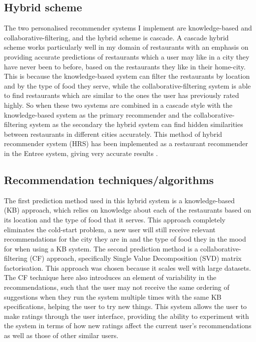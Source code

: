 \documentclass[conference]{IEEEtran}
\begin{document}
\subsection{Hybrid scheme}
The two personalised recommender systems I implement are knowledge-based and collaborative-filtering, and 
the hybrid scheme is cascade. 
A cascade hybrid scheme works particularly well in my domain of restaurants with an emphasis on providing accurate 
predictions of restaurants which a user may like in a city they have never been to before, based on the restaurants 
they like in their home-city. 
This is because the knowledge-based system can filter the restaurants by location and by the type of food they serve, 
while the collaborative-filtering system is able to find restaurants which are similar to the ones the user has 
previously rated highly. 
So when these two systems are combined in a cascade style with the knowledge-based system as the primary recommender 
and the collaborative-filtering system as the secondary the hybrid system can find hidden similarities between 
restaurants in different cities accurately. 
This method of hybrid recommender system (HRS) has been implemented as a restaurant recommender in the Entree 
system, giving very accurate results \cite{burke1999integrating,burke2000knowledge,burke2002hybrid,burke2007hybrid}. 

\subsection{Recommendation techniques/algorithms}
The first prediction method used in this hybrid system is a knowledge-based (KB) approach, which relies on knowledge 
about each of the restaurants based on its location and the type of food that it serves. 
This approach completely eliminates the cold-start problem, a new user will still receive relevant recommendations 
for the city they are in and the type of food they in the mood for when using a KB system. 
The second prediction method is a collaborative-filtering (CF) approach, specifically Single Value Decomposition (SVD) 
matrix factorisation. 
This approach was chosen because it scales well with large datasets. 
The CF technique here also introduces an element of variability in the recommendations, such that the user 
may not receive the same ordering of suggestions when they run the system multiple times with the same 
KB specifications, helping the user to try new things. 
This system allows the user to make ratings through the user interface, providing the ability to experiment with 
the system in terms of how new ratings affect the current user's recommendations as well as those of other similar users. 
\end{document}
